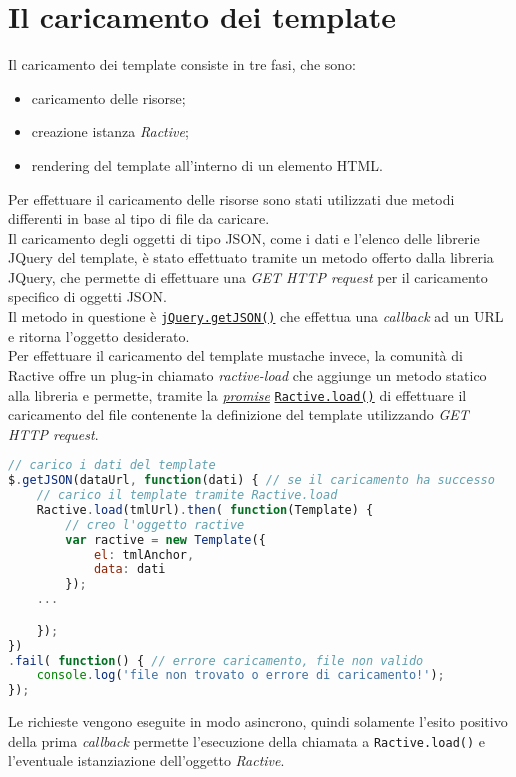 \section{Il caricamento dei template}
Il caricamento dei template consiste in tre fasi, che sono:
\begin{itemize}
	\item caricamento delle risorse;
	\item creazione istanza \textit{Ractive};
	\item rendering del template all'interno di un elemento HTML.
\end{itemize}
Per effettuare il caricamento delle risorse sono stati utilizzati due metodi differenti in base al tipo di file da caricare.\\
Il caricamento degli oggetti di tipo JSON, come i dati e l'elenco delle librerie JQuery del template, è stato effettuato tramite un metodo offerto dalla libreria JQuery, che permette di effettuare una \textit{GET HTTP request} per il caricamento specifico di oggetti JSON.\\
Il metodo in questione è \href{http://api.jquery.com/jquery.getjson/}{\texttt{jQuery.getJSON()}} che effettua una \textit{callback} ad un URL e ritorna l'oggetto desiderato.\\
Per effettuare il caricamento del template mustache invece, la comunità di Ractive offre un plug-in chiamato \textit{ractive-load} che aggiunge un metodo statico alla libreria e permette, tramite la \href{http://www.ecma-international.org/ecma-262/6.0/#sec-promise-objects}{\textit{promise}} \href{https://github.com/ractivejs/ractive-load}{\texttt{Ractive.load()}} di effettuare il caricamento del file contenente la definizione del template utilizzando \textit{GET HTTP request}.
\newpage
\begin{lstlisting}[language=JavaScript, caption=Chiamate \textit{GET HTTP} per il caricamento delle risorse.]
// carico i dati del template
$.getJSON(dataUrl, function(dati) { // se il caricamento ha successo
	// carico il template tramite Ractive.load
	Ractive.load(tmlUrl).then( function(Template) {
		// creo l'oggetto ractive
		var ractive = new Template({
			el: tmlAnchor,
			data: dati
		});
	...

	});
})
.fail( function() { // errore caricamento, file non valido
	console.log('file non trovato o errore di caricamento!');
});
\end{lstlisting}
Le richieste vengono eseguite in modo asincrono, quindi solamente l'esito positivo della prima \textit{callback} permette l'esecuzione della chiamata a \texttt{Ractive.load()} e l'eventuale istanziazione dell'oggetto \textit{Ractive}.\\
